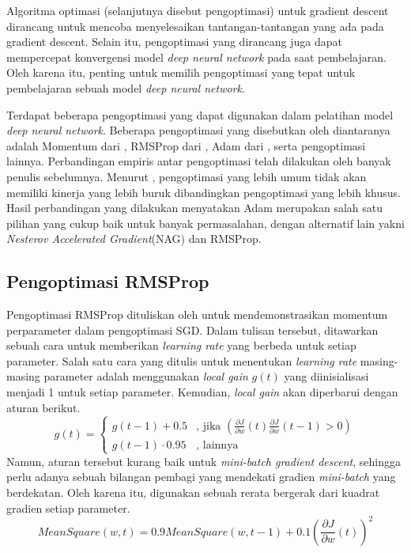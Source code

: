Algoritma optimasi (selanjutnya disebut pengoptimasi) untuk gradient descent dirancang untuk mencoba menyelesaikan tantangan-tantangan yang ada pada gradient descent. Selain itu, pengoptimasi yang dirancang juga dapat mempercepat konvergensi model \emph{deep neural network} pada saat pembelajaran. Oleh karena itu, penting untuk memilih pengoptimasi yang tepat untuk pembelajaran sebuah model \emph{deep neural network}.

Terdapat beberapa pengoptimasi yang dapat digunakan dalam pelatihan model \emph{deep neural network}. Beberapa pengoptimasi yang disebutkan oleh \textcite{Ruder2016} diantaranya adalah Momentum dari \textcite{qian1999momentum}, RMSProp dari \textcite{hinton2012neural}, Adam dari \textcite{ADAMKingma}, serta pengoptimasi lainnya. Perbandingan empiris antar pengoptimasi telah dilakukan oleh banyak penulis sebelumnya. Menurut \textcite{Choi2019}, pengoptimasi yang lebih umum tidak akan memiliki kinerja yang lebih buruk dibandingkan pengoptimasi yang lebih khusus. Hasil perbandingan yang dilakukan \textcite{benchmark2021schmidt} menyatakan Adam merupakan salah satu pilihan yang cukup baik untuk banyak permasalahan, dengan alternatif lain yakni \emph{Nesterov Accelerated Gradient}(NAG) dan RMSProp.

\subsection{Pengoptimasi RMSProp}
Pengoptimasi RMSProp dituliskan oleh \textcite{hinton2012neural} untuk mendemonstrasikan momentum perparameter dalam pengoptimasi SGD. Dalam tulisan tersebut, ditawarkan sebuah cara untuk memberikan \emph{learning rate} yang berbeda untuk setiap parameter. Salah satu cara yang ditulis untuk menentukan \emph{learning rate} masing-masing parameter adalah menggunakan \emph{local gain} $g(t)$ yang diinisialisasi menjadi 1 untuk setiap parameter. Kemudian, \emph{local gain} akan diperbarui dengan aturan berikut.
\begin{equation*}
  g(t) =
  \begin{cases}
    g(t-1) + 0.5      & \text{, jika } \left(
    \frac{\partial J}{\partial w}(t) \frac{\partial J}{\partial w}(t-1) > 0
    \right)                                   \\
    g(t-1) \cdot 0.95 & \text{, lainnya}
  \end{cases}
\end{equation*}
Namun, aturan tersebut kurang baik untuk \emph{mini-batch gradient descent}, sehingga perlu adanya sebuah bilangan pembagi yang mendekati gradien \emph{mini-batch} yang berdekatan. Oleh karena itu, digunakan sebuah rerata bergerak dari kuadrat gradien setiap parameter.
$$
  MeanSquare(w, t) = 0.9 MeanSquare(w, t-1) + 0.1\left(\frac{\partial J}{\partial w}(t)\right)^2
$$

